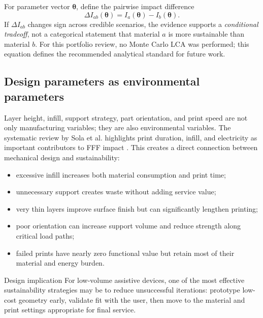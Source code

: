 \documentclass[11pt]{article}
\begin{document}
For parameter vector $\boldsymbol{\theta}$, define the pairwise impact difference
\begin{equation}
  \Delta I_{ab}(\boldsymbol{\theta})=I_a(\boldsymbol{\theta})-I_b(\boldsymbol{\theta}).
\end{equation}
If $\Delta I_{ab}$ changes sign across credible scenarios, the evidence supports a \emph{conditional tradeoff}, not a categorical statement that material $a$ is more sustainable than material $b$. For this portfolio review, no Monte Carlo LCA was performed; this equation defines the recommended analytical standard for future work.


\subsection{Design parameters as environmental parameters}

Layer height, infill, support strategy, part orientation, and print speed are not only manufacturing variables; they are also environmental variables. The systematic review by Sola et al. highlights print duration, infill, and electricity as important contributors to FFF impact \cite{sola2024}. This creates a direct connection between mechanical design and sustainability:

\begin{itemize}
  \item excessive infill increases both material consumption and print time;
  \item unnecessary support creates waste without adding service value;
  \item very thin layers improve surface finish but can significantly lengthen printing;
  \item poor orientation can increase support volume and reduce strength along critical load paths;
  \item failed prints have nearly zero functional value but retain most of their material and energy burden.
\end{itemize}

\begin{keybox}{Design implication}
For low-volume assistive devices, one of the most effective sustainability strategies may be to reduce unsuccessful iterations: prototype low-cost geometry early, validate fit with the user, then move to the material and print settings appropriate for final service.
\end{keybox}

\end{document}
